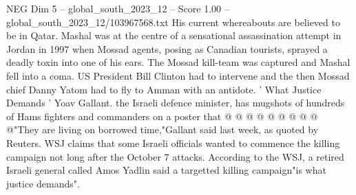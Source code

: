 \begin{textsample}{NEG Dim 5 – global\_south\_2023\_12 – Score 1.00 – global\_south\_2023\_12/103967568.txt}
His current whereabouts are believed to be in Qatar.
Mashal was at the centre of a sensational assassination attempt in Jordan in 1997 when Mossad agents, posing as Canadian tourists, sprayed a deadly toxin into one of his ears.
The Mossad kill-team was captured and Mashal fell into a coma.
US President Bill Clinton had to intervene and the then Mossad chief Danny Yatom had to fly to Amman with an antidote. ' What Justice Demands ' Yoav Gallant. the Israeli defence minister, has mugshots of hundreds of Hams fighters and commanders on a poster that @ @ @ @ @ @ @ @ @ @"They are living on borrowed time,"Gallant said last week, as quoted by Reuters.
WSJ claims that some Israeli officials wanted to commence the killing campaign not long after the October 7 attacks.
According to the WSJ, a retired Israeli general called Amos Yadlin said a targetted killing campaign"is what justice demands".

\end{textsample}
